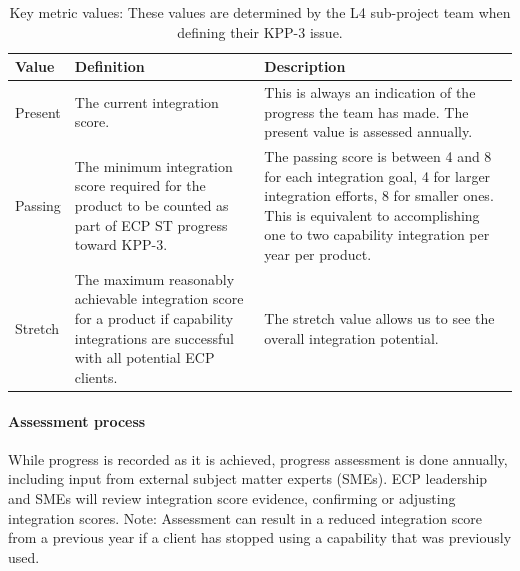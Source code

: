 \begin{table}[h!]
	\begin{tabular}{|L{0.6in}|L{2.0in}|L{3.4in}|}\hline
		Value & Definition & Description\\\hline
		Present & The current integration score. & This is always an indication of the progress the team has made. The present value is assessed annually.\\\hline
		Passing & The minimum integration score required for the product to be counted as part of ECP ST progress toward KPP-3. & The passing score is between 4 and 8 for each integration goal, 4 for larger integration efforts, 8 for smaller ones. This is equivalent to accomplishing one to two capability integration per year per product.\\\hline
		Stretch & The maximum reasonably achievable integration score for a product if capability integrations are successful with all potential ECP clients.   & The stretch value allows us to see the overall integration potential.\\\hline
	\end{tabular}
	\caption{\label{table:KPP-3-values} Key metric values: These values are determined by the L4 sub-project team when defining their KPP-3 issue.}
\end{table}

\paragraph{Assessment process}
While progress is recorded as it is achieved, progress assessment is done annually, including input from external subject matter experts (SMEs).  ECP leadership and SMEs will review integration score evidence, confirming or adjusting integration scores.
Note: Assessment can result in a reduced integration score from a previous year if a client has stopped using a capability that was previously used.

